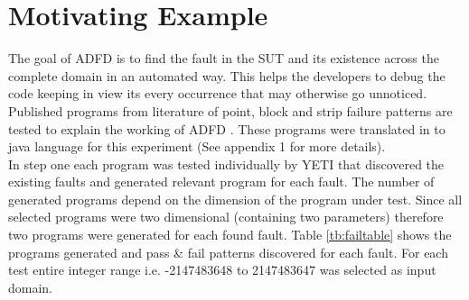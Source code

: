 \documentclass{acm_proc_article-sp}
\begin{document}
\section{Motivating Example}
The goal of ADFD is to find the fault in the SUT and its existence across the complete domain in an automated way. This helps the developers to debug the code keeping in view its every occurrence that may otherwise go unnoticed.
Published programs from literature \cite{Chen2003}\cite{Chan1996}\cite{Chen2004} of point, block and strip failure patterns are tested to explain the working of ADFD . These programs were translated in to java language for this experiment (See appendix 1 for more details). \\

In step one each program was tested individually by YETI that discovered the existing faults and generated relevant program for each fault. The number of generated programs depend on the dimension of the program under test. Since all selected programs were two dimensional (containing two parameters) therefore two programs were generated for each found fault. Table \ref{tb:failtable} shows the programs generated and pass \& fail patterns discovered for each fault. For each test entire integer range i.e. -2147483648 to 2147483647 was selected as input domain.\\
\end{document}
